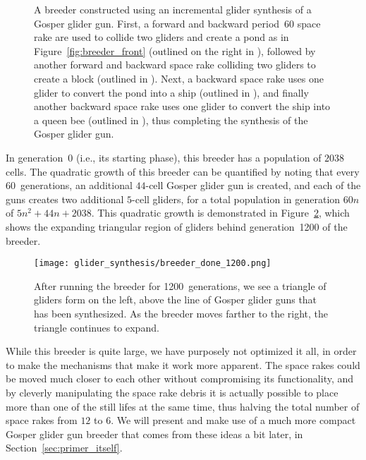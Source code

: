 \begin{figure}[!ht]
	\centering{}
	\caption{A breeder constructed using an incremental glider synthesis of a Gosper glider gun. First, a forward and backward period~60 space rake are used to collide two gliders and create a pond as in Figure~\ref{fig:breeder_front} (outlined on the right in ), followed by another forward and backward space rake colliding two gliders to create a block (outlined in ). Next, a backward space rake uses one glider to convert the pond into a ship (outlined in ), and finally another backward space rake uses one glider to convert the ship into a queen bee (outlined in ), thus completing the synthesis of the Gosper glider gun.}\label{fig:breeder_done}
\end{figure}

In generation~0 (i.e., its starting phase), this breeder has a population of $2038$ cells. The quadratic growth of this breeder can be quantified by noting that every 60~generations, an additional $44$-cell Gosper glider gun is created, and each of the guns creates two additional $5$-cell gliders, for a total population in generation $60n$ of $5n^2 + 44n + 2038$. This quadratic growth is demonstrated in Figure~\ref{fig:breeder_done_1200}, which shows the expanding triangular region of gliders behind generation~1200 of the breeder.

\begin{figure}[!ht]
	\centering\texttt{[image: glider\_synthesis/breeder\_done\_1200.png]}
	\caption{After running the breeder for 1200~generations, we see a triangle of gliders form on the left, above the line of Gosper glider guns that has been synthesized. As the breeder moves farther to the right, the triangle continues to expand.}\label{fig:breeder_done_1200}
\end{figure}

While this breeder is quite large, we have purposely not optimized it all, in order to make the mechanisms that make it work more apparent. The space rakes could be moved much closer to each other without compromising its functionality, and by cleverly manipulating the space rake debris it is actually possible to place more than one of the still lifes at the same time, thus halving the total number of space rakes from $12$ to $6$. We will present and make use of a much more compact Gosper glider gun breeder that comes from these ideas a bit later, in Section~\ref{sec:primer_itself}.


